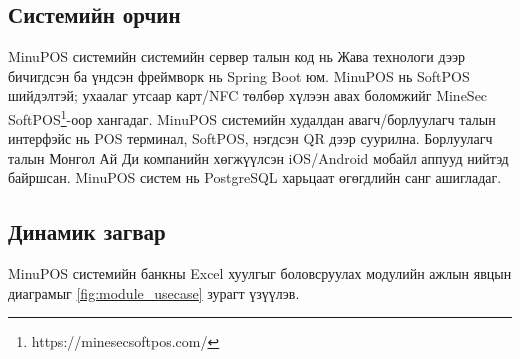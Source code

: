 \subsection{Системийн орчин}

MinuPOS системийн системийн сервер талын код нь Жава технологи дээр бичигдсэн ба үндсэн фреймворк нь Spring Boot юм. MinuPOS нь SoftPOS шийдэлтэй; ухаалаг утсаар карт/NFC төлбөр хүлээн авах боломжийг MineSec SoftPOS\footnote{https://minesecsoftpos.com/}-оор хангадаг.
MinuPOS системийн худалдан авагч/борлуулагч талын интерфэйс нь POS терминал, SoftPOS, нэгдсэн QR дээр суурилна. Борлуулагч талын Монгол Ай Ди компанийн хөгжүүлсэн iOS/Android мобайл аппууд нийтэд байршсан.
MinuPOS систем нь PostgreSQL харьцаат өгөгдлийн санг ашигладаг. 
\newpage
\subsection{Динамик загвар}
MinuPOS системийн банкны Excel хуулгыг боловсруулах модулийн ажлын явцын диаграмыг \ref{fig:module_usecase} зурагт үзүүлэв. 



  
  

